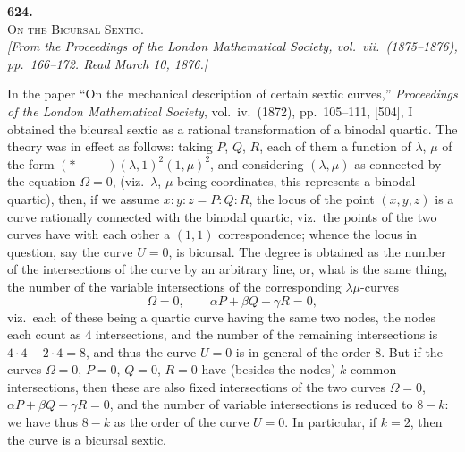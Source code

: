 \documentclass[11pt]{article}
\begin{document}

\bigskip\bigskip
\begin{center}
{\Large\bfseries 624.}\\[2pt]
{\large\scshape On the Bicursal Sextic.}\\[6pt]
\textit{[From the Proceedings of the London Mathematical Society, vol.~vii.\ (1875--1876), pp.~166--172. Read March 10, 1876.]}
\end{center}

\bigskip

In the paper ``On the mechanical description of certain sextic curves,'' \textit{Proceedings of the London Mathematical Society}, vol.~iv.\ (1872), pp.~105--111, [504], I obtained the bicursal sextic as a rational transformation of a binodal quartic. The theory was in effect as follows: taking $P$, $Q$, $R$, each of them a function of $\lambda$, $\mu$ of the form $(\ast\!\!\!\!\!\;\;\;\!\!\!\!\!\;\;\;\!\!\!\!\!\;\;\;)(\lambda, 1)^2(1,\mu)^2$, and considering $(\lambda,\mu)$ as connected by the equation $\Omega = 0$, (viz.\ $\lambda$, $\mu$ being coordinates, this represents a binodal quartic), then, if we assume $x : y : z = P : Q : R$, the locus of the point $(x, y, z)$ is a curve rationally connected with the binodal quartic, viz.\ the points of the two curves have with each other a $(1,1)$ correspondence; whence the locus in question, say the curve $U = 0$, is bicursal. The degree is obtained as the number of the intersections of the curve by an arbitrary line, or, what is the same thing, the number of the variable intersections of the corresponding $\lambda\mu$-curves
\[
\Omega = 0,\qquad \alpha P + \beta Q + \gamma R = 0,
\]
viz.\ each of these being a quartic curve having the same two nodes, the nodes each count as $4$ intersections, and the number of the remaining intersections is $4\cdot 4 - 2\cdot 4 = 8$, and thus the curve $U = 0$ is in general of the order $8$. But if the curves $\Omega = 0$, $P = 0$, $Q = 0$, $R = 0$ have (besides the nodes) $k$ common intersections, then these are also fixed intersections of the two curves $\Omega = 0$, $\alpha P + \beta Q + \gamma R = 0$, and the number of variable intersections is reduced to $8 - k$: we have thus $8 - k$ as the order of the curve $U = 0$. In particular, if $k = 2$, then the curve is a bicursal sextic.
\end{document}
